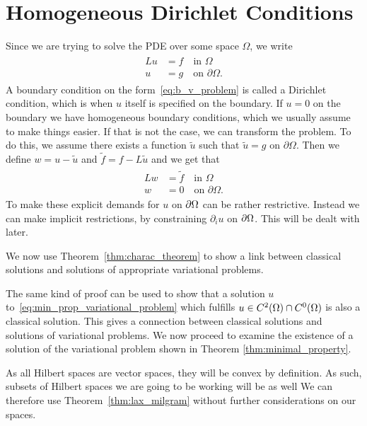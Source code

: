\section{Homogeneous Dirichlet Conditions}
Since we are trying to solve the PDE over some space $\Omega$, we write
\begin{align}
\begin{split}
    Lu &= f \quad \text{in } \Omega \label{eq:b_v_problem} \\
    u &= g \quad \text{on } \partial \Omega.
\end{split}
\end{align}
A boundary condition on the form~\eqref{eq:b_v_problem} is called a 
Dirichlet condition, which is when $u$ itself is specified on the boundary. 
If $u=0$ on the boundary we have homogeneous boundary conditions, which we usually assume 
to make things easier. If that is not the case, we can
transform the problem. To do this, we assume there exists a function 
$\tilde{u}$ such that $\tilde{u}=g$ on $\partial \Omega$. Then we define 
$w = u - \tilde{u}$ and $\tilde{f}=f-L\tilde{u}$ and we get that
\begin{align}
\begin{split}
    Lw &= \tilde{f} \quad \text{in } \Omega \label{eq:b_v_problem_homogeneous} \\
    w &= 0 \quad \text{on } \partial \Omega. 
\end{split}
\end{align}
To make these explicit demands for $u$ on $\partial \Omega$ can 
be rather restrictive.
Instead we can make implicit restrictions, by constraining 
$\partial _i u$ on $\partial \Omega$.
This will be dealt with later.

We now use Theorem~\ref{thm:charac_theorem} to show a link between classical 
solutions and solutions of appropriate variational problems.

The same kind of proof can be used to show that a solution $u$ to~\eqref{eq:min_prop_variational_problem} which fulfills 
$u\in C^2(\Omega) \cap C^0(\Omega)$ is also a classical solution. 
This gives a connection between classical solutions and solutions of 
variational problems. We now proceed to examine the existence of a 
solution of the variational problem shown in Theorem \ref{thm:minimal_property}.

As all Hilbert spaces are vector spaces, they will be convex by definition.
As such, subsets of Hilbert spaces we are going to be working will be as well
We can therefore use Theorem~\ref{thm:lax_milgram} without further considerations 
on our spaces.


